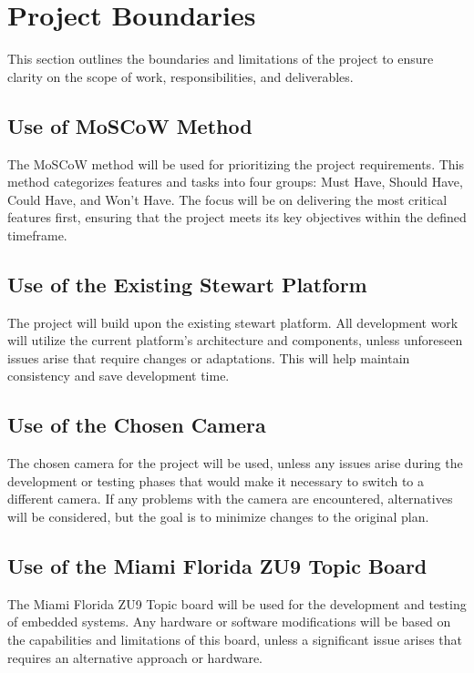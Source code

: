 \documentclass{article}
\begin{document}
\newpage
\section{Project Boundaries}

This section outlines the boundaries and limitations of the project to ensure
clarity on the scope of work, responsibilities, and deliverables.

\subsection{Use of MoSCoW Method} The MoSCoW method will be used for
prioritizing the project requirements. This method categorizes features and
tasks into four groups: Must Have, Should Have, Could Have, and Won't Have. The
focus will be on delivering the most critical features first, ensuring that the
project meets its key objectives within the defined timeframe.

\subsection{Use of the Existing Stewart Platform} The project will build upon
the existing stewart platform. All development work will utilize the current
platform's architecture and components, unless unforeseen issues arise that
require changes or adaptations. This will help maintain consistency and save
development time.

\subsection{Use of the Chosen Camera} The chosen camera for the project will be
used, unless any issues arise during the development or testing phases that
would make it necessary to switch to a different camera. If any problems with
the camera are encountered, alternatives will be considered, but the goal is to
minimize changes to the original plan.

\subsection{Use of the Miami Florida ZU9 Topic Board} The Miami Florida ZU9
Topic board will be used for the development and testing of embedded systems.
Any hardware or software modifications will be based on the capabilities and
limitations of this board, unless a significant issue arises that requires an
alternative approach or hardware.
\end{document}
